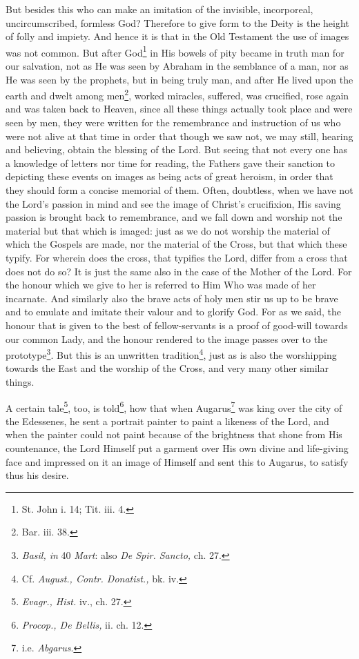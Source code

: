 But besides this who can make an imitation of the invisible, incorporeal, uncircumscribed, formless God? Therefore to give form to the Deity is the height of folly and impiety. And hence it is that in the Old Testament the use of images was not common. But after God\footnote{St. John i. 14; Tit. iii. 4.} in His bowels of pity became in truth man for our salvation, not as He was seen by Abraham in the semblance of a man, nor as He was seen by the prophets, but in being truly man, and after He lived upon the earth and dwelt among men\footnote{Bar. iii. 38.}, worked miracles, suffered, was crucified, rose again and was taken back to Heaven, since all these things actually took place and were seen by men, they were written for the remembrance and instruction of us who were not alive at that time in order that though we saw not, we may still, hearing and believing, obtain the blessing of the Lord. But seeing that not every one has a knowledge of letters nor time for reading, the Fathers gave their sanction to depicting these events on images as being acts of great heroism, in order that they should form a concise memorial of them. Often, doubtless, when we have not the Lord’s passion in mind and see the image of Christ’s crucifixion, His saving passion is brought back to remembrance, and we fall down and worship not the material but that which is imaged: just as we do not worship the material of which the Gospels are made, nor the material of the Cross, but that which these typify. For wherein does the cross, that typifies the Lord, differ from a cross that does not do so? It is just the same also in the case of the Mother of the Lord. For the honour which we give to her is referred to Him Who was made of her incarnate. And similarly also the brave acts of holy men stir us up to be brave and to emulate and imitate their valour and to glorify God. For as we said, the honour that is given to the best of fellow-servants is a proof of good-will towards our common Lady, and the honour rendered to the image passes over to the prototype\footnote{\emph{Basil, in} 40 \emph{Mart}: also \emph{De Spir. Sancto, }ch. 27.}. But this is an unwritten tradition\footnote{Cf. \emph{August., Contr. Donatist., }bk. iv.}, just as is also the worshipping towards the East and the worship of the Cross, and very many other similar things.

A certain tale\footnote{\emph{Evagr., Hist.} iv., ch. 27.}, too, is told\footnote{\emph{Procop., De Bellis, }ii. ch. 12.}, how that when Augarus\footnote{i.e. \emph{Abgarus}.} was king over the city of the Edessenes, he sent a portrait painter to paint a likeness of the Lord, and when the painter could not paint because of the brightness that shone from His countenance, the Lord Himself put a garment over His own divine and life-giving face and impressed on it an image of Himself and sent this to Augarus, to satisfy thus his desire.

